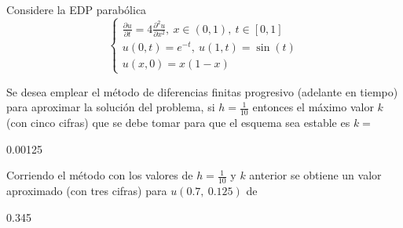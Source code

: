 \documentclass{article}
\begin{document}
\begin{quiz}{}
    \begin{cloze}{}
	Considere la EDP parab\'olica
	\[\begin{cases}
		\displaystyle\frac{\partial u}{\partial t} = 4\frac{\partial^2 u}{\partial x^2}, \ x\in(0,1), \ t\in[0,1] \\
		u(0,t) = e^{-t}, \ u(1,t)=\sin(t) \\
		u(x,0) = x(1-x)
	\end{cases}\]
	\begin{numerical}[points=15]{}
		Se desea emplear el m\'etodo de diferencias finitas progresivo  (adelante en tiempo) para aproximar la soluci\'on del problema, si $h=\frac{1}{10}$ entonces el m\'aximo valor $k$ (con cinco cifras) que se debe tomar para que el esquema sea estable es $k=$\item 0.00125
	\end{numerical}
	\begin{numerical}[points=18]{}
		Corriendo el m\'etodo con los valores de $h=\frac{1}{10}$ y $k$ anterior se obtiene un valor aproximado (con tres cifras) para $u(0.7,\ 0.125)$ de \item[tolerance=0.003] 0.345
	\end{numerical}
\end{cloze}
    \end{quiz}
\end{document}
